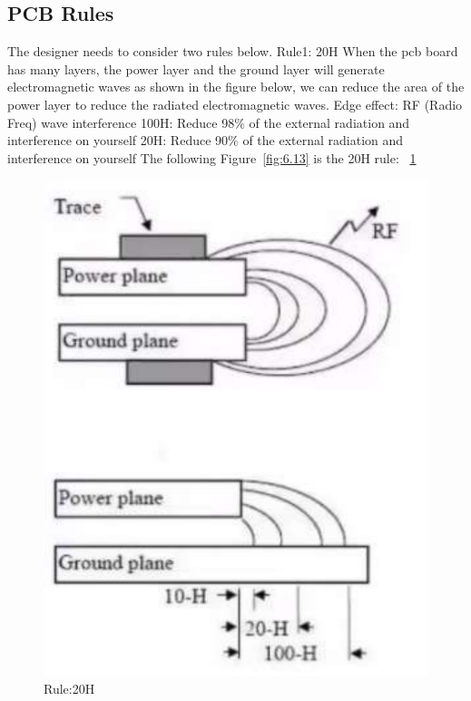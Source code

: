\subsection{PCB Rules}
\label{sec:PCB Rules}
The designer needs to consider two rules below. 
Rule1: 20H
When the pcb board has many layers, the power layer and the ground layer will generate electromagnetic waves as shown in the figure below, we can reduce the area of the power layer to reduce the radiated electromagnetic waves.
Edge effect: RF (Radio Freq) wave interference
100H: Reduce 98$\%$ of the external radiation and interference on yourself
20H: Reduce 90$\%$ of the external radiation and interference on yourself
The following Figure~\ref{fig:6.13} is the 20H rule:
~\ref{fig:6.12}
\begin{figure}[!ht]
	\centering
	\includegraphics[width=16cm]{grafiken/6.12.pdf}
	\caption{Rule:20H} 
	\label{fig:6.12}
\end{figure}
\FloatBarrier
\\


